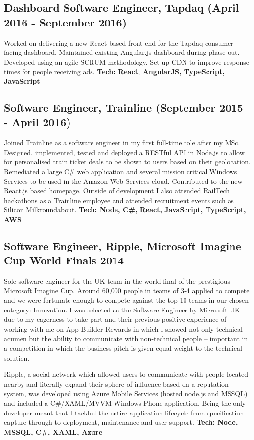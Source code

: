\documentclass[10pt,letterpaper]{article}
\begin{document}
	\subsection*{Dashboard Software Engineer, Tapdaq \small{(April 2016 - September 2016)}}
	Worked on delivering a new React based front-end for the Tapdaq consumer facing dashboard. Maintained existing Angular.js dashboard during phase out. Developed using an agile SCRUM methodology. Set up CDN to improve response times for people receiving ads.
	\textbf{Tech: React, AngularJS, TypeScript, JavaScript}
	
	\subsection*{Software Engineer, Trainline \small{(September 2015 - April 2016)}}
	Joined Trainline as a software engineer in my first full-time role after my MSc. Designed, implemented, tested and deployed a RESTful API in Node.js to allow for personalised train ticket deals to be shown to users based on their geolocation. Remediated a large C\# web application and several mission critical Windows Services to be used in the Amazon Web Services cloud. Contributed to the new React.js based homepage. Outside of development I also attended RailTech hackathons as a Trainline employee and attended recruitment events such as Silicon Milkroundabout.
		\textbf{Tech: Node, C\#, React, JavaScript, TypeScript, AWS}
	
	\subsection*{Software Engineer, Ripple, Microsoft Imagine Cup World Finals 2014}
	Sole software engineer for the UK team in the world final of the prestigious Microsoft Imagine Cup. Around 60,000 people in teams of 3-4 applied to compete and we were fortunate enough to compete against the top 10 teams in our chosen category: Innovation. I was selected as the Software Engineer by Microsoft UK due to my eagerness to take part and their previous positive experience of working with me on App Builder Rewards in which I showed not only technical acumen but the ability to communicate with non-technical people -- important in a competition in which the business pitch is given equal weight to the technical solution.

	Ripple, a social network which allowed users to communicate with people located nearby and literally expand their sphere of influence based on a reputation system, was developed using Azure Mobile Services (hosted node.js and MSSQL) and included a C\#/XAML/MVVM Windows Phone application. Being the only developer meant that I tackled the entire application lifecycle from specification capture through to deployment, maintenance and user support.
	\textbf{Tech: Node, MSSQL, C\#, XAML, Azure}
\end{document}
